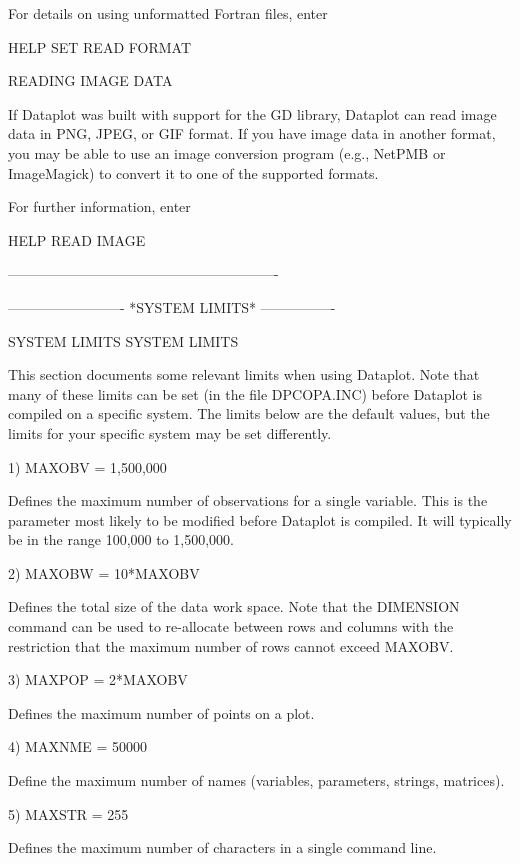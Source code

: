 For details on using unformatted Fortran files, enter

     HELP SET READ FORMAT


READING IMAGE DATA

If Dataplot was built with support for the GD library, Dataplot
can read image data in PNG, JPEG, or GIF format.  If you have
image data in another format, you may be able to use an image
conversion program (e.g., NetPMB or ImageMagick) to convert it
to one of the supported formats.

For further information, enter

    HELP READ IMAGE


----------------------------------------------------------












-------------------------  *SYSTEM LIMITS*  ----------------
 
SYSTEM LIMITS
SYSTEM LIMITS
 
This section documents some relevant limits when using Dataplot.
Note that many of these limits can be set (in the file DPCOPA.INC)
before Dataplot is compiled on a specific system.  The limits below
are the default values, but the limits for your specific system may
be set differently.


  1) MAXOBV   = 1,500,000

     Defines the maximum number of observations for a single
     variable.  This is the parameter most likely to be modified
     before Dataplot is compiled.  It will typically be in the
     range 100,000 to 1,500,000.

  2) MAXOBW   = 10*MAXOBV

     Defines the total size of the data work space.  Note that
     the DIMENSION command can be used to re-allocate between
     rows and columns with the restriction that the maximum
     number of rows cannot exceed MAXOBV.

  3) MAXPOP   = 2*MAXOBV

     Defines the maximum number of points on a plot.
  
  4) MAXNME   = 50000

     Define the maximum number of names (variables, parameters,
     strings, matrices).

  5) MAXSTR   = 255

     Defines the maximum number of characters in a single command
     line.

